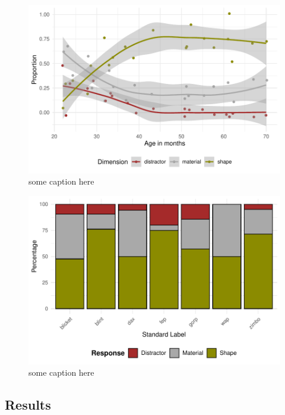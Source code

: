 \documentclass[10pt, letterpaper]{article}
\newenvironment{CodeChunk}{}{}
\begin{document}
\begin{CodeChunk}
\begin{figure}[tb]
\includegraphics[width=1\linewidth]{figs/first_exp-1} \caption[some caption here]{some caption here}\label{fig:first_exp}
\end{figure}
\end{CodeChunk}

\begin{CodeChunk}
\begin{figure}[tb]
\includegraphics[width=1\linewidth]{figs/first_exp_stim-1} \caption[some caption here]{some caption here}\label{fig:first_exp_stim}
\end{figure}
\end{CodeChunk}

\hypertarget{results}{%
\subsection{Results}\label{results}}
\end{document}
